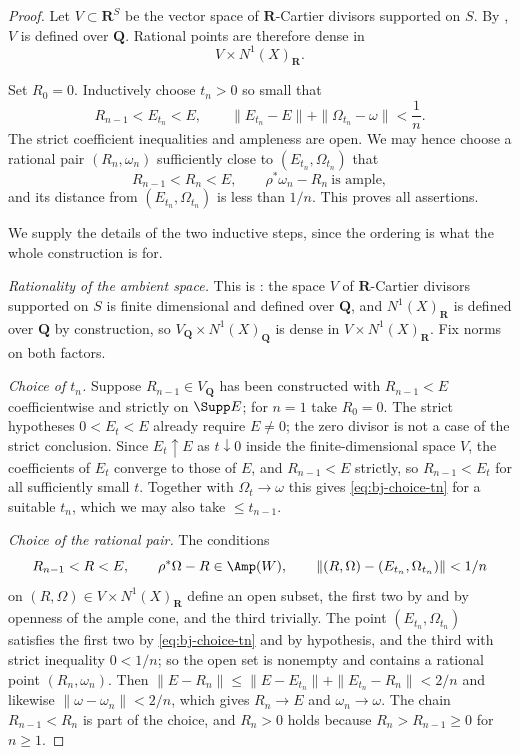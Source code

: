 \begin{proof}
Let $V\subset\mathbf R^S$ be the vector space of
$\mathbf R$-Cartier divisors supported on $S$.
By , $V$ is defined
over $\mathbf Q$.  Rational points are therefore dense in
\[
                       V\times N^1(X)_{\mathbf R}.
\]

Set $R_0=0$.  Inductively choose $t_n>0$ so small that
\[
 R_{n-1}<E_{t_n}<E,\qquad
 \|E_{t_n}-E\|+\|\Omega_{t_n}-\omega\|<\frac1n.
\tag{38.24}\label{eq:bj-choice-tn}
\]
The strict coefficient inequalities and ampleness are open.  We may hence
choose a rational pair $(R_n,\omega_n)$ sufficiently close to
$(E_{t_n},\Omega_{t_n})$ that
\[
 R_{n-1}<R_n<E,\qquad
 \rho^*\omega_n-R_n\ \text{is ample},
\]
and its distance from $(E_{t_n},\Omega_{t_n})$ is less than $1/n$.
This proves all assertions.

We supply the details of the two inductive steps, since the ordering is
what the whole construction is for.

\emph{Rationality of the ambient space.}  This is
: the space $V$ of
$\mathbf R$-Cartier divisors supported on $S$ is finite dimensional and
defined over $\mathbf Q$, and $N^1(X)_{\mathbf R}$ is defined over
$\mathbf Q$ by construction, so $V_{\mathbf Q}\times N^1(X)_{\mathbf Q}$
is dense in $V\times N^1(X)_{\mathbf R}$.  Fix norms on both factors.

\emph{Choice of $t_n$.}  Suppose $R_{n-1}\in V_{\mathbf Q}$ has been
constructed with $R_{n-1}<E$ coefficientwise and strictly on
$\Supp E$; for $n=1$ take $R_0=0$. The strict hypotheses
$0<E_t<E$ already require $E\neq0$; the zero divisor is not a
case of the strict conclusion.  Since $E_t\uparrow E$ as $t\downarrow0$ inside the
finite-dimensional space $V$, the coefficients of $E_t$ converge to
those of $E$, and $R_{n-1}<E$ strictly, so
$R_{n-1}<E_{t}$ for all sufficiently small $t$.  Together with
$\Omega_t\to\omega$ this gives \eqref{eq:bj-choice-tn} for a suitable
$t_n$, which we may also take $\leq t_{n-1}$.

\emph{Choice of the rational pair.}  The conditions
\[
 R_{n-1}<R<E,
 \qquad
  \rho^*\Omega-R\in\Amp(W),
 \qquad
 \|(R,\Omega)-(E_{t_n},\Omega_{t_n})\|<1/n
\]
on $(R,\Omega)\in V\times N^1(X)_{\mathbf R}$ define an open subset,
the first two by  and by openness of
the ample cone, and the third trivially.  The point
$(E_{t_n},\Omega_{t_n})$ satisfies the first two by
\eqref{eq:bj-choice-tn} and by hypothesis, and the third with strict
inequality $0<1/n$; so the open set is nonempty and contains a rational
point $(R_n,\omega_n)$.  Then
$\|E-R_n\|\leq\|E-E_{t_n}\|+\|E_{t_n}-R_n\|<2/n$ and likewise
$\|\omega-\omega_n\|<2/n$, which gives $R_n\to E$ and
$\omega_n\to\omega$.  The chain $R_{n-1}<R_n$ is part of the choice,
and $R_n>0$ holds because $R_n>R_{n-1}\geq0$ for $n\geq1$.
\end{proof}

